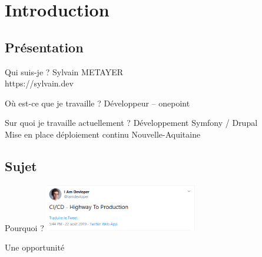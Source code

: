 \section{Introduction}

\subsection{Présentation}

\begin{frame}{\subsecname}
	\begin{block}{Qui suis-je ?}
	Sylvain METAYER \\ 
	https://sylvain.dev
	\end{block}
	\pause
	\begin{block}{Où est-ce que je travaille ?}
	Développeur -- onepoint
	\end{block}
	\pause
	\begin{block}{Sur quoi je travaille actuellement ?}
	Développement Symfony / Drupal\\ 	
	Mise en place déploiement continu Nouvelle-Aquitaine
	\end{block}
\end{frame}

\subsection{Sujet}
\begin{frame}{\subsecname}
	 \begin{overprint}
			\begin{block}{Pourquoi ?}
			\centering \includegraphics[width=0.5\textwidth]{img/highway-ci.png}
			\end{block}
			\begin{block}{Une opportunité}
			\end{block}
	\end{overprint} 
\end{frame}
